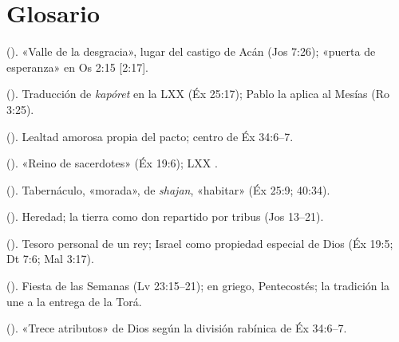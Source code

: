 \section*{Glosario}
\begin{description}\small
\item[Émeq Ajor] (). «Valle de la desgracia», lugar del castigo de Acán (Jos 7:26); «puerta de esperanza» en Os 2:15 [2:17].
\item[Hilastérion] (). Traducción de \emph{kapóret} en la LXX (Éx 25:17); Pablo la aplica al Mesías (Ro 3:25).
\item[Jésed] (). Lealtad amorosa propia del pacto; centro de Éx 34:6–7.
\item[Mamléjet kohaním] (). «Reino de sacerdotes» (Éx 19:6); LXX .
\item[Mishkán] (). Tabernáculo, «morada», de \emph{shajan}, «habitar» (Éx 25:9; 40:34).
\item[Najalá] (). Heredad; la tierra como don repartido por tribus (Jos 13–21).
\item[Segulá] (). Tesoro personal de un rey; Israel como propiedad especial de Dios (Éx 19:5; Dt 7:6; Mal 3:17).
\item[Shavuot] (). Fiesta de las Semanas (Lv 23:15–21); en griego, Pentecostés; la tradición la une a la entrega de la Torá.
\item[Shelosh esré midot] (). «Trece atributos» de Dios según la división rabínica de Éx 34:6–7.
\end{description}

